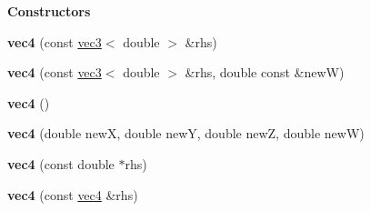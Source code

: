 \begin{Indent}{\bf Constructors}\par
{\em \label{_amgrp559a25fdb98a7d1fd1c3771ac568d5e9}
 }\begin{DoxyCompactItemize}
\item 
\hypertarget{classmath_1_1vec4_aee9b7c4c7b20e496f57c623f06844a06}{
{\bfseries vec4} (const \hyperlink{classmath_1_1vec3}{vec3}$<$ double $>$ \&rhs)}
\label{classmath_1_1vec4_aee9b7c4c7b20e496f57c623f06844a06}

\item 
\hypertarget{classmath_1_1vec4_a1c46df3cfa784f3b6358256a5343a429}{
{\bfseries vec4} (const \hyperlink{classmath_1_1vec3}{vec3}$<$ double $>$ \&rhs, double const \&newW)}
\label{classmath_1_1vec4_a1c46df3cfa784f3b6358256a5343a429}

\item 
\hypertarget{classmath_1_1vec4_acd70cfec2ef8ac46c9756b4044beecaa}{
{\bfseries vec4} ()}
\label{classmath_1_1vec4_acd70cfec2ef8ac46c9756b4044beecaa}

\item 
\hypertarget{classmath_1_1vec4_a971cd0daa320c1863c0b2ee36b0da491}{
{\bfseries vec4} (double newX, double newY, double newZ, double newW)}
\label{classmath_1_1vec4_a971cd0daa320c1863c0b2ee36b0da491}

\item 
\hypertarget{classmath_1_1vec4_a9d296da24af2eb515c56cefe80f42e55}{
{\bfseries vec4} (const double $\ast$rhs)}
\label{classmath_1_1vec4_a9d296da24af2eb515c56cefe80f42e55}

\item 
\hypertarget{classmath_1_1vec4_a0e5fa5f584295fe1b6bb66ebcbcb01e9}{
{\bfseries vec4} (const \hyperlink{classmath_1_1vec4}{vec4} \&rhs)}
\label{classmath_1_1vec4_a0e5fa5f584295fe1b6bb66ebcbcb01e9}

\end{DoxyCompactItemize}
\end{Indent}
